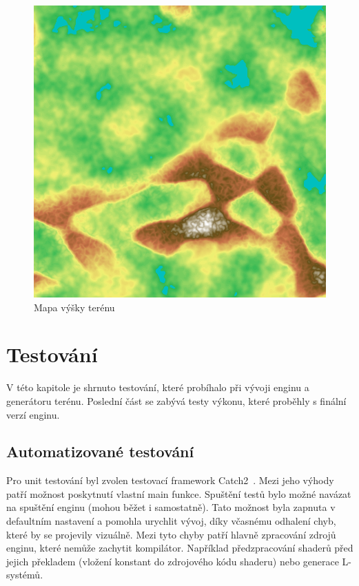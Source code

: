 \documentclass[thesis=M,czech]{FITthesis}[2019/12/23]
\begin{document}
\begin{figure}\centering
	\includegraphics[width=\textwidth]{images/world_gen/height}
	\caption[Mapa výšky terénu]{Mapa výšky terénu}\label{fig:height}
\end{figure}


\chapter{Testování}

V této kapitole je shrnuto testování, které probíhalo při vývoji enginu a generátoru terénu. Poslední část se zabývá testy výkonu, které proběhly s finální verzí enginu.

\section{Automatizované testování}

Pro unit testování byl zvolen testovací framework Catch2~\cite{catch2}. Mezi jeho výhody patří možnost poskytnutí vlastní main funkce. Spuštění testů bylo možné navázat na spuštění enginu (mohou běžet i samostatně). Tato možnost byla zapnuta v defaultním nastavení a pomohla urychlit vývoj, díky včasnému odhalení chyb, které by se projevily vizuálně. Mezi tyto chyby patří hlavně zpracování zdrojů enginu, které nemůže zachytit kompilátor. Například před\-zpracování shaderů před jejich překladem (vložení konstant do zdrojového kódu shaderu) nebo generace L-systémů.
\end{document}
